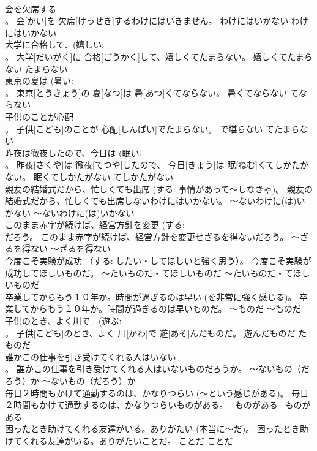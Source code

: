 \documentclass[8pt]{extreport}
\begin{document}
\begin{CJK}{UTF8}{min}
\\	会を欠席する 
\\	。	会[かい]を 欠席[けっせき]するわけにはいきません。	わけにはいかない	わけにはいかない	
\\	大学に合格して、(嬉しい: 
\\	。	大学[だいがく]に 合格[ごうかく]して、嬉しくてたまらない。	嬉しくてたまらない	たまらない	
\\	東京の夏は (暑い: 
\\	。	東京[とうきょう]の 夏[なつ]は 暑[あつ]くてならない。	暑くてならない	てならない	
\\	子供のことが心配 
\\	。	子供[こども]のことが 心配[しんぱい]でたまらない。	で堪らない	てたまらない	
\\	昨夜は徹夜したので、今日は (眠い: 
\\	。	昨夜[さくや]は 徹夜[てつや]したので、 今日[きょう]は 眠[ねむ]くてしかたがない。	眠くてしかたがない	てしかたがない	
\\	親友の結婚式だから、忙しくても出席 (する: 事情があって～しなきゃ)。	親友の結婚式だから、忙しくても出席しないわけにはいかない。	～ないわけに(は)いかない	～ないわけに(は)いかない	
\\	このまま赤字が続けば、経営方針を変更 (する: 
\\	だろう。	このまま赤字が続けば、経営方針を変更せざるを得ないだろう。	～ざるを得ない	～ざるを得ない	
\\	今度こそ実験が成功 （する: したい・してほしいと強く思う）。	今度こそ実験が成功してほしいものだ。	～たいものだ・てほしいものだ	～たいものだ・てほしいものだ	
\\	卒業してからもう１０年か。時間が過ぎるのは早い (を非常に強く感じる)。	卒業してからもう１０年か。時間が過ぎるのは早いものだ。	～ものだ	～ものだ	
\\	子供のとき、よく川で　(遊ぶ: 
\\	。	子供[こども]のとき、よく 川[かわ]で 遊[あそ]んだものだ。	遊んだものだ	たものだ	
\\	誰かこの仕事を引き受けてくれる人はいない 
\\	。	誰かこの仕事を引き受けてくれる人はいないものだろうか。	～ないもの（だろう）か	～ないもの（だろう）か	
\\	毎日２時間もかけて通勤するのは、かなりつらい (～という感じがある)。	毎日２時間もかけて通勤するのは、かなりつらいものがある。	~ものがある	~ものがある	
\\	困ったとき助けてくれる友達がいる。ありがたい (本当に～だ)。	困ったとき助けてくれる友達がいる。ありがたいことだ。	ことだ	ことだ	

\end{CJK}
\end{document}
